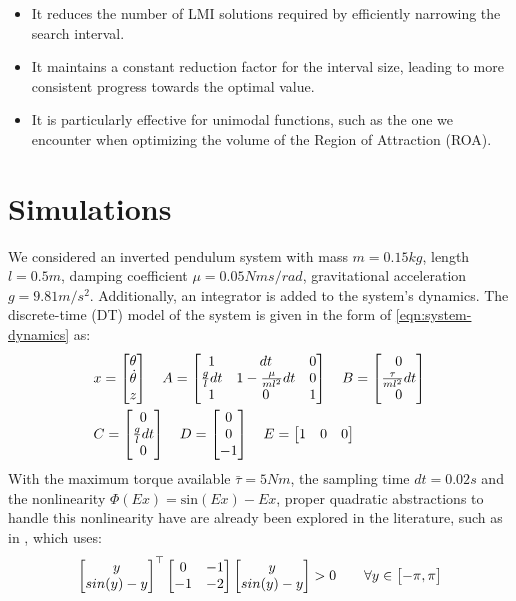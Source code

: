 \documentclass{ifacconf}
\theoremstyle{plain}
\begin{document}
\begin{itemize}
  \item It reduces the number of LMI solutions required by efficiently narrowing the search interval.
  \item It maintains a constant reduction factor for the interval size, leading to more consistent progress towards the optimal value.
  \item It is particularly effective for unimodal functions, such as the one we encounter when optimizing the volume of the Region of Attraction (ROA).
\end{itemize}

\section{Simulations}
We considered an inverted pendulum system with mass $m = 0.15 kg$, length $l = 0.5 m$, damping coefficient $\mu = 0.05 N ms/rad$, gravitational acceleration $g = 9.81 m/s^2$. Additionally, an integrator is added to the system's dynamics. The discrete-time (DT) model of the system is given in the form of \eqref{eqn:system-dynamics} as:
\begin{equation}\label{eqn:pendulum}
\begin{aligned}
  &x = \left[\begin{matrix}\theta \\ \dot{\theta} \\ z\end{matrix}\right] \quad 
  A = \left[\begin{matrix}1 & dt & 0\\
  \frac{g}{l} dt & 1 - \frac{\mu}{m l^2} dt & 0\\
  1 & 0 & 1\end{matrix}\right]\quad
  B = \left[\begin{matrix}0\\ \frac{\relax{\tau}}{m l^2} dt\\ 0\end{matrix}\right] \\
  &C = \left[\begin{matrix}0 \\ \frac{g}{l} dt \\ 0\end{matrix}\right] \quad
  D = \left[\begin{matrix}0 \\ 0 \\ -1\end{matrix}\right] \quad
  E = \left[\begin{matrix}1 & 0 & 0\end{matrix}\right]
\end{aligned}
\end{equation}
With the maximum torque available $\bar{\tau} = 5 N m$, the sampling time $dt = 0.02 s$ and the nonlinearity $\Phi(Ex) = \text{sin}(Ex) - Ex$, proper quadratic abstractions to handle this nonlinearity have are already been explored in the literature, such as in \citep{junnarkar2024synthesizing}, which uses:
$$
\left[\begin{matrix}y\\sin(y) - y\end{matrix}\right]^\top \left[\begin{matrix}0 & -1 \\ -1 & -2\end{matrix}\right] \left[\begin{matrix}y\\sin(y)-y\end{matrix}\right] > 0 \qquad \forall y \in \left[\begin{matrix}-\pi, \pi\end{matrix}\right]
$$
\end{document}
